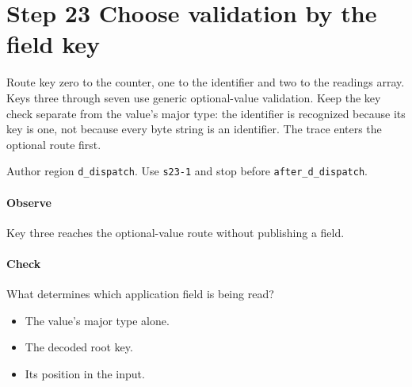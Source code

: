 \section{Step 23 Choose validation by the field key}\label{cbor-s23}
Route key zero to the counter, one to the identifier and two to the readings array. Keys three through seven use generic optional-value validation. Keep the key check separate from the value's major type: the identifier is recognized because its key is one, not because every byte string is an identifier. The trace enters the optional route first.

Author region \texttt{d\_dispatch}. Use \texttt{s23-1} and stop before \texttt{after\_d\_dispatch}.

\paragraph{Observe} Key three reaches the optional-value route without publishing a field.

\paragraph{Check} What determines which application field is being read?
\begin{itemize}
\item[A.] The value's major type alone.
\item[B.] The decoded root key.
\item[C.] Its position in the input.
\end{itemize}
